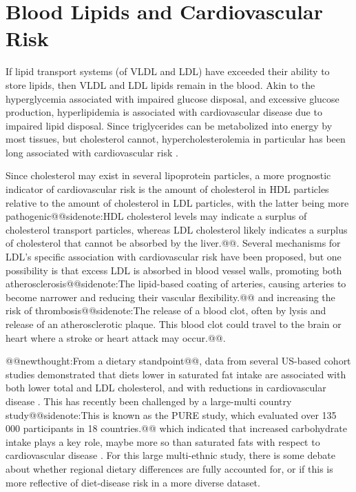 \documentclass{tufte-handout}
\makeatletter
\def\newthought#1{@@newthought:#1@@}
\def\sidenote#1{@@sidenote:#1@@}
\makeatother
\begin{document}
\section{Blood Lipids and Cardiovascular Risk}

If lipid transport systems (of VLDL and LDL) have exceeded their ability to store lipids, then VLDL and LDL lipids remain in the blood.  Akin to the hyperglycemia associated with impaired glucose disposal, and excessive glucose production, hyperlipidemia is associated with cardiovascular disease due to impaired lipid disposal.  Since triglycerides can be metabolized into energy by most tissues, but cholesterol cannot, hypercholesterolemia in particular has been long associated with cardiovascular risk \citep{Keys1963}.

Since cholesterol may exist in several lipoprotein particles, a more prognostic indicator of cardiovascular risk is the amount of cholesterol in HDL particles relative to the amount of cholesterol in LDL particles, with the latter being more pathogenic\sidenote{HDL cholesterol levels may indicate a surplus of cholesterol transport particles, whereas LDL cholesterol likely indicates a surplus of cholesterol that cannot be absorbed by the liver.}.  Several mechanisms for LDL's specific association with cardiovascular risk have been proposed, but one possibility is that excess LDL is absorbed in blood vessel walls, promoting both atherosclerosis\sidenote{The lipid-based coating of arteries, causing arteries to become narrower and reducing their vascular flexibility.} and increasing the risk of thrombosis\sidenote{The release of a blood clot, often by lysis and release of an atherosclerotic plaque.  This blood clot could travel to the brain or heart where a stroke or heart attack may occur.}.

\newthought{From a dietary standpoint}, data from several US-based cohort studies demonstrated that diets lower in saturated fat intake are associated with both lower total and LDL cholesterol, and with reductions in cardiovascular disease \citep{Anderson1987,Wang2016b}.  This has recently been challenged by a large-multi country study\sidenote{This is known as the PURE study, which evaluated over 135 000 participants in 18 countries.} which indicated that increased carbohydrate intake plays a key role, maybe more so than saturated fats with respect to cardiovascular disease \citep{Mente2017}.  For this large multi-ethnic study, there is some debate about whether regional dietary differences are fully accounted for, or if this is more reflective of diet-disease risk in a more diverse dataset.  
\end{document}

